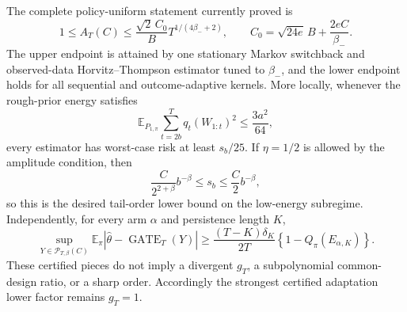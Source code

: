The complete policy-uniform statement currently proved is
\[
1\le A_T(C)\le \frac{\sqrt{2}\,C_0}{B}T^{1/(4\beta_-+2)},
\qquad
C_0=\sqrt{24e}\,B+\frac{2eC}{\beta_-}.
\]
The upper endpoint is attained by one stationary Markov switchback and observed-data Horvitz--Thompson estimator tuned to \(\beta_-\), and the lower endpoint holds for all sequential and outcome-adaptive kernels. More locally, whenever the rough-prior energy satisfies
\[
\mathbb E_{P_{1,\pi}}\sum_{t=2b}^Tq_t(W_{1:t})^2\le\frac{3a^2}{64},
\]
every estimator has worst-case risk at least \(s_b/25\). If \(\eta=1/2\) is allowed by the amplitude condition, then
\[
\frac{C}{2^{2+\beta}}b^{-\beta}\le s_b\le\frac{C}{2}b^{-\beta},
\]
so this is the desired tail-order lower bound on the low-energy subregime. Independently, for every arm \(\alpha\) and persistence length \(K\),
\[
\sup_{Y\in\mathcal P_{T,\beta}(C)}\mathbb E_\pi\left|\widehat\theta-\operatorname{GATE}_T(Y)\right|
\ge
\frac{(T-K)\delta_K}{2T}\left\{1-Q_\pi(E_{\alpha,K})\right\}.
\]
These certified pieces do not imply a divergent \(g_T\), a subpolynomial common-design ratio, or a sharp order. Accordingly the strongest certified adaptation lower factor remains \(g_T=1\).